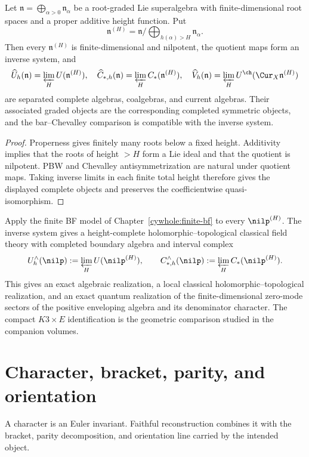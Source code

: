 \begin{theorem}
Let $\mathfrak n=\bigoplus_{\alpha>0}\mathfrak n_\alpha$ be a root-graded Lie superalgebra with finite-dimensional root spaces and a proper additive height function.  Put
\[
 \mathfrak n^{(H)}=\mathfrak n/\!\bigoplus_{h(\alpha)>H}\mathfrak n_\alpha.
\]
Then every $\mathfrak n^{(H)}$ is finite-dimensional and nilpotent, the quotient maps form an inverse system, and
\[
 \widehat U_h(\mathfrak n)=\varprojlim_HU(\mathfrak n^{(H)}),\quad
 \widehat C_{*,h}(\mathfrak n)=\varprojlim_HC_*(\mathfrak n^{(H)}),\quad
 \widehat V_h(\mathfrak n)=\varprojlim_HU^{\ch}(\Cur_X\mathfrak n^{(H)})
\]
are separated complete algebras, coalgebras, and current algebras.  Their associated graded objects are the corresponding completed symmetric objects, and the bar--Chevalley comparison is compatible with the inverse system.
\end{theorem}
\begin{proof}
Properness gives finitely many roots below a fixed height.  Additivity implies that the roots of height $>H$ form a Lie ideal and that the quotient is nilpotent.  PBW and Chevalley antisymmetrization are natural under quotient maps.  Taking inverse limits in each finite total height therefore gives the displayed complete objects and preserves the coefficientwise quasi-isomorphism.
\end{proof}

Apply the finite BF model of Chapter~\ref{cywhole:finite-bf} to every $\nilp^{(H)}$. The inverse system gives a height-complete holomorphic--topological classical field theory with completed boundary algebra and interval complex
\[
 U_h^\wedge(\nilp):=\varprojlim_H U(\nilp^{(H)}),
 \qquad
 C_{*,h}^\wedge(\nilp):=\varprojlim_H C_*(\nilp^{(H)}).
\]
This gives an exact algebraic realization, a local classical holomorphic--topological realization, and an exact quantum realization of the finite-dimensional zero-mode sectors of the positive enveloping algebra and its denominator character. The compact $K3\times E$ identification is the geometric comparison studied in the companion volumes.

\chapter{Character, bracket, parity, and orientation}
A character is an Euler invariant.  Faithful reconstruction combines it with the bracket, parity decomposition, and orientation line carried by the intended object.

